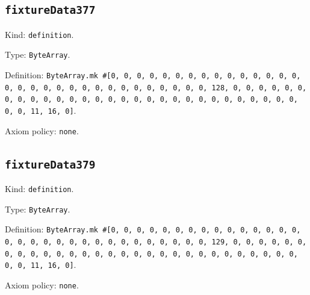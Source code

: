\documentclass[11pt]{article}
\begin{document}
\subsection*{\texttt{fixtureData377}}
\noindent Kind: \texttt{definition}.\par
\noindent Type: \texttt{ByteArray}.\par
\noindent Definition: \texttt{ByteArray.mk \#[0, 0, 0, 0, 0, 0, 0, 0, 0, 0, 0, 0, 0, 0, 0, 0, 0, 0, 0, 0, 0, 0, 0, 0, 0, 0, 0, 0, 0, 0, 0, 128, 0, 0, 0, 0, 0, 0, 0, 0, 0, 0, 0, 0, 0, 0, 0, 0, 0, 0, 0, 0, 0, 0, 0, 0, 0, 0, 0, 0, 0, 0, 0, 11, 16, 0]}.\par
\noindent Axiom policy: \texttt{none}.\par
\subsection*{\texttt{fixtureData379}}
\noindent Kind: \texttt{definition}.\par
\noindent Type: \texttt{ByteArray}.\par
\noindent Definition: \texttt{ByteArray.mk \#[0, 0, 0, 0, 0, 0, 0, 0, 0, 0, 0, 0, 0, 0, 0, 0, 0, 0, 0, 0, 0, 0, 0, 0, 0, 0, 0, 0, 0, 0, 0, 129, 0, 0, 0, 0, 0, 0, 0, 0, 0, 0, 0, 0, 0, 0, 0, 0, 0, 0, 0, 0, 0, 0, 0, 0, 0, 0, 0, 0, 0, 0, 0, 11, 16, 0]}.\par
\noindent Axiom policy: \texttt{none}.\par
\end{document}
